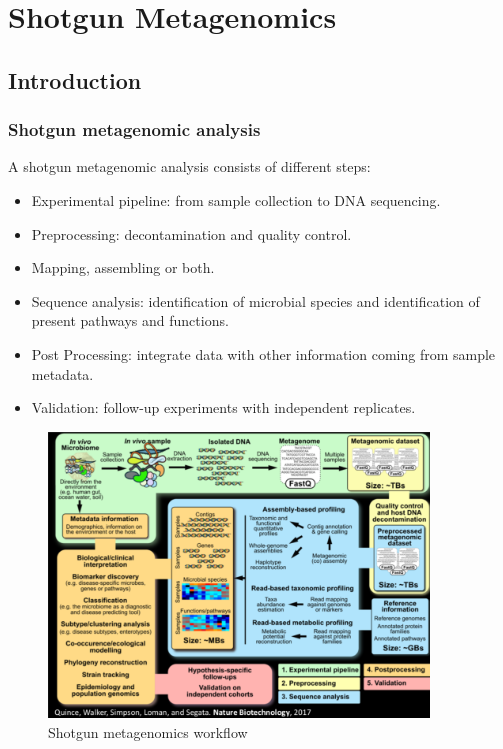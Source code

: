\graphicspath{{chapters/images/08/}}

\chapter{Shotgun Metagenomics}

\section{Introduction}

    \subsection{Shotgun metagenomic analysis}
    A shotgun metagenomic analysis consists of different steps:

    \begin{multicols}{2}
        \begin{itemize}
            \item Experimental pipeline: from sample collection to DNA sequencing.
            \item Preprocessing:  decontamination and quality control.
            \item Mapping, assembling or both.
            \item Sequence analysis:  identification of microbial species and identification of present pathways and functions.
            \item Post Processing: integrate data with other information coming from sample metadata.
            \item Validation:  follow-up experiments with independent replicates.
        \end{itemize}
    \end{multicols}

    \begin{figure}[!h]
        \centering
        \includegraphics[width=0.9\textwidth]{Shotgun_workflow.png}
        \caption{\label{fig:workflow}Shotgun metagenomics workflow}
    \end{figure}

